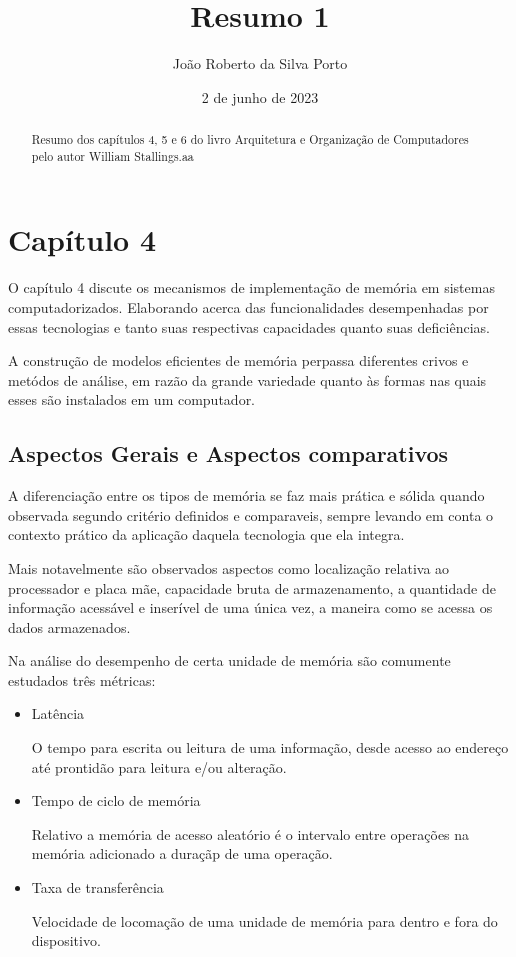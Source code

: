 \documentclass[12pt]{elsarticle}
\begin{document}
        

\begin{frontmatter}

\title{Resumo 1}

\date{2 de junho de 2023}

\author{João Roberto da Silva Porto}

\address{Ufba - Departamento da Computação - Profa. Mirlei Moura da Silva}
\begin{abstract}
Resumo dos capítulos 4, 5 e 6 do livro Arquitetura e Organização de Computadores pelo autor William Stallings.aa
\end{abstract}

\end{frontmatter}

\section{Capítulo 4}

O capítulo 4 discute os mecanismos de implementação de memória em sistemas computadorizados. Elaborando acerca das funcionalidades desempenhadas por essas tecnologias e tanto suas respectivas capacidades quanto suas deficiências.

A construção de modelos eficientes de memória perpassa diferentes crivos e metódos de análise, em razão da grande variedade quanto às formas nas quais esses são instalados em um computador.

\subsection{Aspectos Gerais e Aspectos comparativos}
A diferenciação entre os tipos de memória se faz mais prática e sólida quando observada segundo critério definidos e comparaveis, sempre levando em conta o contexto prático da aplicação daquela tecnologia que ela integra.

Mais notavelmente são observados aspectos como localização relativa ao processador e placa mãe, capacidade bruta de armazenamento, a quantidade de informação acessável e inserível de uma única vez, a maneira como se acessa os dados armazenados.

Na análise do desempenho de certa unidade de memória são comumente estudados três métricas:
\begin{itemize}
    \item Latência

    O tempo para escrita ou leitura de uma informação, desde acesso ao endereço até prontidão para leitura e/ou alteração.

    \item Tempo de ciclo de memória

    Relativo a memória de acesso aleatório é o intervalo entre operações na memória adicionado a duraçãp de uma operação.

    \item  Taxa de transferência

    Velocidade de locomação de uma unidade de memória para dentro e fora do dispositivo.
\end{itemize}
\end{document}
